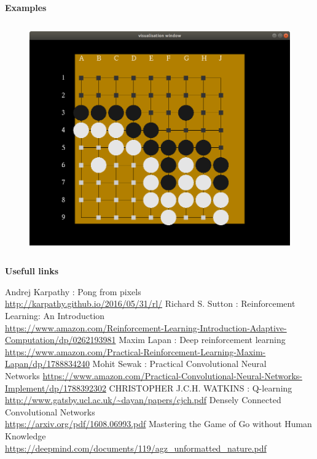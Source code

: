 \documentclass[xcolor=dvipsnames]{beamer}
\begin{document}
\begin{frame}{\bf Examples}
\begin{columns}
\begin{column}{0.5\textwidth}
  \begin{figure}
  \includegraphics[scale=0.19]{../../pictures/go.png}
  \end{figure}

\end{column}
\end{columns}



\end{frame}




\begin{frame}{\bf Usefull links}

{\tiny
  \begin{thebibliography}{9}
    \bibitem {}Andrej Karpathy : Pong from pixels \\ \url{http://karpathy.github.io/2016/05/31/rl/}
    \bibitem {}Richard S. Sutton : Reinforcement Learning: An Introduction \\ \url{https://www.amazon.com/Reinforcement-Learning-Introduction-Adaptive-Computation/dp/0262193981}
    \bibitem {}Maxim Lapan : Deep reinforcement learning \\ \url{https://www.amazon.com/Practical-Reinforcement-Learning-Maxim-Lapan/dp/1788834240}
    \bibitem {}Mohit Sewak : Practical Convolutional Neural \\ Networks \url{https://www.amazon.com/Practical-Convolutional-Neural-Networks-Implement/dp/1788392302}
    \bibitem {}CHRISTOPHER  J.C.H. WATKINS : Q-learning \\ \url{http://www.gatsby.ucl.ac.uk/~dayan/papers/cjch.pdf}
    \bibitem {}Densely Connected Convolutional Networks \\ \url{https://arxiv.org/pdf/1608.06993.pdf}
    \bibitem {}Mastering the Game of Go without Human Knowledge \\ \url{https://deepmind.com/documents/119/agz_unformatted\_nature.pdf}
  \end{thebibliography}
}

\end{frame}
\end{document}
